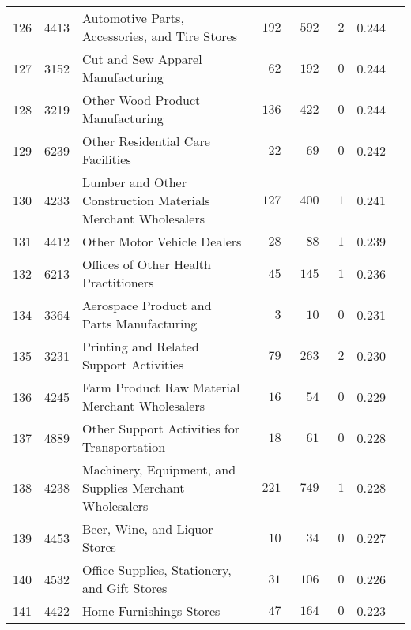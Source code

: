 \documentclass[9pt, oneside]{article}   	%
\begin{document}
\begin{longtable}{lcp{3 in}ccccc}
126  & 4413 & Automotive Parts, Accessories, and Tire Stores & $\phantom{0}192$ & $\phantom{0}592$ & $\phantom{0}2$ & 0.244 \\
127  & 3152 & Cut and Sew Apparel Manufacturing & $\phantom{00}62$ & $\phantom{0}192$ & $\phantom{0}0$ & 0.244 \\
128  & 3219 & Other Wood Product Manufacturing & $\phantom{0}136$ & $\phantom{0}422$ & $\phantom{0}0$ & 0.244 \\
129  & 6239 & Other Residential Care Facilities & $\phantom{00}22$ & $\phantom{00}69$ & $\phantom{0}0$ & 0.242 \\
130  & 4233 & Lumber and Other Construction Materials Merchant Wholesalers & $\phantom{0}127$ & $\phantom{0}400$ & $\phantom{0}1$ & 0.241 \\
131  & 4412 & Other Motor Vehicle Dealers & $\phantom{00}28$ & $\phantom{00}88$ & $\phantom{0}1$ & 0.239 \\
132  & 6213 & Offices of Other Health Practitioners & $\phantom{00}45$ & $\phantom{0}145$ & $\phantom{0}1$ & 0.236 \\

134  & 3364 & Aerospace Product and Parts Manufacturing & $\phantom{000}3$ & $\phantom{00}10$ & $\phantom{0}0$ & 0.231 \\
135  & 3231 & Printing and Related Support Activities & $\phantom{00}79$ & $\phantom{0}263$ & $\phantom{0}2$ & 0.230 \\
136  & 4245 & Farm Product Raw Material Merchant Wholesalers & $\phantom{00}16$ & $\phantom{00}54$ & $\phantom{0}0$ & 0.229 \\
137  & 4889 & Other Support Activities for Transportation & $\phantom{00}18$ & $\phantom{00}61$ & $\phantom{0}0$ & 0.228 \\
138  & 4238 & Machinery, Equipment, and Supplies Merchant Wholesalers & $\phantom{0}221$ & $\phantom{0}749$ & $\phantom{0}1$ & 0.228 \\
139  & 4453 & Beer, Wine, and Liquor Stores & $\phantom{00}10$ & $\phantom{00}34$ & $\phantom{0}0$ & 0.227 \\
140  & 4532 & Office Supplies, Stationery, and Gift Stores & $\phantom{00}31$ & $\phantom{0}106$ & $\phantom{0}0$ & 0.226 \\
141  & 4422 & Home Furnishings Stores & $\phantom{00}47$ & $\phantom{0}164$ & $\phantom{0}0$ & 0.223 \\


\end{longtable}
\end{document}
